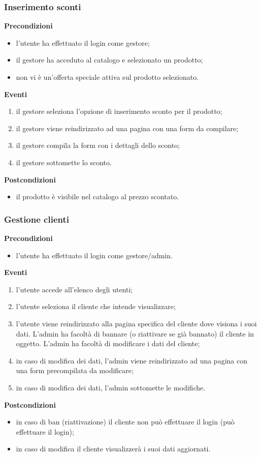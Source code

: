 \documentclass[a4paper, 14pt]{article}
\begin{document}
\begin{flushleft}
			\bigskip
			\subsubsection{Inserimento sconti}
			\textbf{Precondizioni}
			\begin{itemize}
				\item l'utente ha effettuato il login come gestore;
				\item il gestore ha acceduto al catalogo e selezionato un prodotto;
				\item non vi è un'offerta speciale attiva sul prodotto selezionato.
			\end{itemize}
			\textbf{Eventi}
			\begin{enumerate}
				\item il gestore seleziona l'opzione di inserimento sconto per il prodotto;
				\item il gestore viene reindirizzato ad una pagina con una form da compilare;
				\item il gestore compila la form con i dettagli dello sconto;
				\item il gestore sottomette lo sconto.
			\end{enumerate}
			\textbf{Postcondizioni}
			\begin{itemize}
				\item il prodotto è visibile nel catalogo al prezzo scontato.
			\end{itemize}
		
			\bigskip
			\subsubsection{Gestione clienti}
			\textbf{Precondizioni}
			\begin{itemize}
				\item l'utente ha effettuato il login come gestore/admin.
			\end{itemize}
			\textbf{Eventi}
			\begin{enumerate}
				\item l'utente accede all'elenco degli utenti;
				\item l'utente seleziona il cliente che intende visualizzare;
				\item l'utente viene reindirizzato alla pagina specifica del cliente dove visiona i suoi dati.
					  L'admin ha facoltà di bannare (o riattivare se già bannato) il cliente in oggetto.
					  L'admin ha facoltà di modificare i dati del cliente;
				\item in caso di modifica dei dati, l'admin viene reindirizzato ad una pagina con una form precompilata
					  da modificare;
				\item in caso di modifica dei dati, l'admin sottomette le modifiche.
			\end{enumerate}
			\textbf{Postcondizioni}
			\begin{itemize}
				\item in caso di ban (riattivazione) il cliente non può effettuare il login (può effettuare il login);
				\item in caso di modifica il cliente visualizzerà i suoi dati aggiornati.
			\end{itemize}
			

\end{flushleft}
\end{document}
